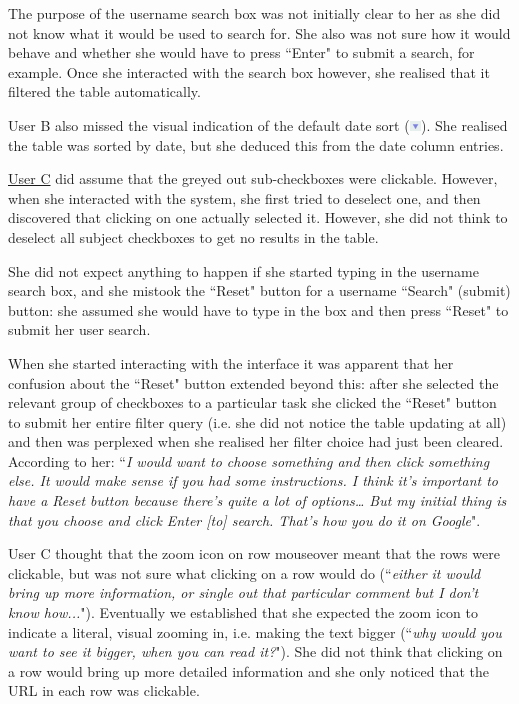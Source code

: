 The purpose of the username search box was not initially clear to her as she did not know what it would be used to search for. She also was not sure how it would behave and whether she would have to press ``Enter" to submit a search, for example. Once she interacted with the search box however, she realised that it filtered the table automatically. 

User B also missed the visual indication of the default date sort (\includegraphics[width=0.3cm]{Figures/sortarrowdown.png}). She realised the table was sorted by date, but she deduced this from the date column entries.

\underline{User C} did assume that the greyed out sub-checkboxes were clickable. However, when she interacted with the system, she first tried to deselect one, and then discovered that clicking on one actually selected it. However, she did not think to deselect all subject checkboxes to get no results in the table. 

She did not expect anything to happen if she started typing in the username search box, and she mistook the ``Reset" button for a username ``Search" (submit) button: she assumed she would have to type in the box and then press ``Reset" to submit her user search. 

When she started interacting with the interface it was apparent that her confusion about the ``Reset" button extended beyond this: after she selected the relevant group of checkboxes to a particular task she clicked the ``Reset" button to submit her entire filter query (i.e. she did not notice the table updating at all) and then was perplexed when she realised her filter choice had just been cleared. According to her: ``\textit{I would want to choose something and then click something else.  It would make sense if you had some instructions. I think it's important to have a Reset button because there's quite a lot of options… But my initial thing is that you choose and click Enter [to] search. That's how you do it on Google}". 

User C thought that the zoom icon on row mouseover meant that the rows were clickable, but was not sure what clicking on a row would do (``\textit{either it would bring up more information, or single out that particular comment but I don't know how...}"). Eventually we established that she expected the zoom icon to indicate a literal, visual zooming in, i.e. making the text bigger (``\textit{why would you want to see it bigger, when you can read it?}"). She did not think that clicking on a row would bring up more detailed information and she only noticed that the URL in each row was clickable. 

